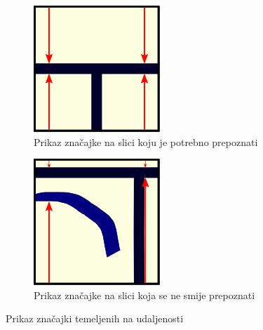 \documentclass[times, utf8, zavrsni, numeric]{fer}
\begin{document}
\begin{figure}[th!]
    \centering
    \begin{subfigure}{.5\textwidth}
        \centering
        \includegraphics[width=.45\linewidth]{Images/Feature_true_1.png}
        \captionsetup{justification=centering}
        \caption{Prikaz značajke na slici koju je potrebno prepoznati}
        \label{fig:featureDemo1a}
    \end{subfigure}%
    \begin{subfigure}{.5\textwidth}
        \centering
        \includegraphics[width=.45\linewidth]{Images/Feature_false_1.png}
        \caption{Prikaz značajke na slici koja se ne smije prepoznati}
        \label{fig:featureDemo1b}
    \end{subfigure}
    \caption{Prikaz značajki temeljenih na udaljenosti}
    \label{fig:featureDemo1}
\end{figure}
\end{document}
